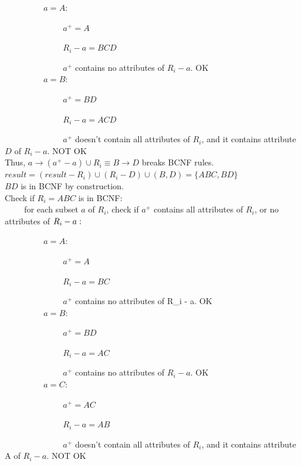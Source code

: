 \documentclass[a4paper]{article}
\begin{document}
~~~~ ~~~~ $ a = A:$ 

~~~~ ~~~~ ~~~~ 	$ a^+ = A$

~~~~ ~~~~ ~~~~ 	$ R_i - a = BCD $ 

~~~~ ~~~~ ~~~~ 	$ a^+ $ contains no attributes of $R_i - a$. OK \\
				
~~~~ ~~~~ 	$ a = B: $ 

~~~~ ~~~~ ~~~~ 	$ a^+ = BD $ 
				
~~~~ ~~~~ ~~~~ 	$ R_i - a = ACD $ 
				
~~~~ ~~~~ ~~~~ $ a^+ $ doesn't contain all attributes of $ R_i $, and it contains attribute $D$ of $ R_i - a $. NOT OK\\
				
Thus, $ a \rightarrow (a^+ - a) \cup R_i \equiv B \rightarrow D$ breaks BCNF rules. \\

$ result = (result-R_i) \cup (R_i-D) \cup (B,D) = \{ABC, BD\}$ \\

$BD$ is in BCNF by construction. \\

Check if $R_i = ABC$ is in BCNF: \\

~~~~ for each subset $a$ of $R_i$, check if $a^+$ contains all attributes of $ R_i $, or no attributes of $ R_i - a: \\ $
	
~~~~ ~~~~ $ a = A: $

~~~~ ~~~~ ~~~~		$ a^+ = A $
		
~~~~ ~~~~ ~~~~		$ R_i - a = BC $
		
~~~~ ~~~~ ~~~~		$ a^+ $ contains no attributes of R_i - a. OK \\
		
~~~~ ~~~~ 		$a = B: $
		
~~~~ ~~~~ ~~~~		$ a^+ = BD $
		
~~~~ ~~~~ ~~~~		$ R_i - a = AC $
		
~~~~ ~~~~ ~~~~		$ a^+ $ contains no attributes of $ R_i - a $. OK \\
		
~~~~ ~~~~ 		$ a = C: $ 
		
~~~~ ~~~~ ~~~~		$ a^+ = AC $
				
~~~~ ~~~~ ~~~~		$R_i - a = AB $
				
~~~~ ~~~~ ~~~~		$a^+$ doesn't contain all attributes of $ R_i $, and it contains attribute A of $R_i - a$. NOT OK \\
		
\end{document}
